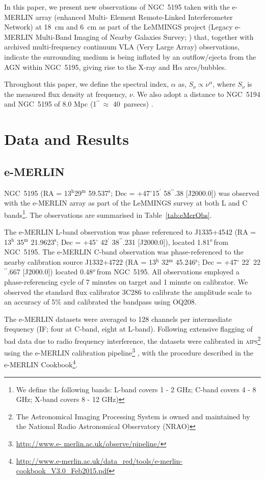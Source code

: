 \documentclass[fleqn,usenatbib]{mnras}
\def\Tab{Table}
\def\deg{$^{o}\,$}
\def\arcs{$^{\prime\prime}\,$}
\begin{document}
In this paper, we present new observations of NGC~5195 taken with the e-MERLIN array (enhanced Multi-
Element Remote-Linked Interferometer Network) at 18~cm and 6~cm as part of the LeMMINGS project (Legacy 
e-MERLIN Multi-Band Imaging of Nearby Galaxies Survey; \citealt{lemmings2014}) that, together with 
archived multi-frequency continuum VLA (Very Large Array) observations, indicate 
the surrounding medium is being inflated by an outflow/ejecta from the AGN within NGC~5195, giving rise to the X-ray and H$\alpha$ arcs/bubbles.

Throughout this paper, we define the spectral index, $\alpha$ as, $S_{\nu} \propto \nu^{\alpha}$, where $S_{\nu}$ is the measured flux density at frequency, $\nu$. We also adopt a distance to NGC~5194 and NGC~5195 of  8.0 Mpc (1\arcs $\approx$ 40~parsecs) \citep{SJMV}.


\section{Data and Results}
\label{sec:obs}

\subsection{e-MERLIN}

NGC~5195 (RA = 13$^{\mathrm{h}}$29$^{\mathrm{m}}$ 59.537$^{\mathrm{s}}$; Dec = +47$^{\circ}$15$^{\prime}$ 58$^{\prime\prime}$.38 [J2000.0]) was observed with the e-MERLIN array as part of the LeMMINGS survey at both L and C bands\footnote{We define the following bands: L-band covers 1 - 2 GHz; C-band covers 4 - 8 GHz; X-band covers 8 - 12 GHz)}. The observations are summarised in \Tab~\ref{tab:eMerObs}. 

The e-MERLIN L-band observation was phase referenced to J1335+4542 (RA = 13$^{\mathrm{h}}$ 35$^{\mathrm{m}}$ 
21.9623$^{\mathrm{s}}$; Dec = +45$^{\circ}$ 42$^{\prime}$ 38$^{\prime\prime}$.231 [J2000.0]), located 1.81\deg from NGC~5195.
The e-MERLIN C-band observation was phase-referenced to the nearby calibration source J1332+4722 (RA = 13$^{\mathrm{h}}$ 32$^{\mathrm{m}}$ 45.246$^{\mathrm{s}}$; Dec = +47$^{\circ}$ 22$^{\prime}$ 22$^{\prime\prime}$.667 [J2000.0]) located 0.48\deg from NGC~5195. All observations employed a phase-referencing cycle of 7 minutes on target and 1 minute on calibrator. {We observed the standard flux	calibrator 3C286 to	calibrate the amplitude scale to an accuracy of 5$\%$ and calibrated the bandpass using OQ208. }

The e-MERLIN datasets were averaged to 128 channels {per} intermediate frequency (IF; four at C-band, eight at L-band). Following extensive flagging of bad data due to radio frequency interference, the datasets were calibrated in 
\textsc{aips}\footnote{The Astronomical Imaging Processing System is owned and maintained by the National Radio  
Astronomical  Observatory  (NRAO)} using the e-MERLIN calibration pipeline\footnote{\url{http://www.e-
merlin.ac.uk/observe/pipeline/}} \citep{Argo2014}, with the procedure described in the e-MERLIN 
Cookbook\footnote{\url{http://www.e-merlin.ac.uk/data_red/tools/e-merlin-cookbook_V3.0_Feb2015.pdf}}. 
\end{document}
